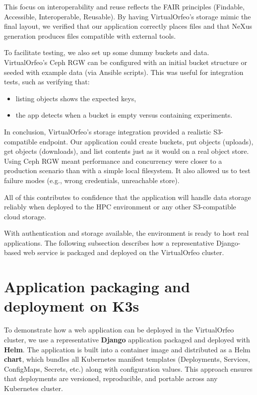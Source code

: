This focus on interoperability and reuse reflects the FAIR principles (Findable, 
Accessible, Interoperable, Reusable). By having VirtualOrfeo’s storage mimic the 
final layout, we verified that our application correctly places files and that 
NeXus generation produces files compatible with external tools.

\medskip

To facilitate testing, we also set up some dummy buckets and data. VirtualOrfeo’s 
Ceph RGW can be configured with an initial bucket structure or seeded with 
example data (via Ansible scripts). This was useful for integration tests, such 
as verifying that:  

\begin{itemize}
	\item listing objects shows the expected keys,  
	\item the app detects when a bucket is empty versus containing experiments.  
\end{itemize}

\medskip

In conclusion, VirtualOrfeo’s storage integration provided a realistic 
S3-compatible endpoint. Our application could create buckets, put objects 
(uploads), get objects (downloads), and list contents just as it would on a real 
object store. Using Ceph RGW meant performance and concurrency were closer to a 
production scenario than with a simple local filesystem. It also allowed us to 
test failure modes (e.g., wrong credentials, unreachable store).  

All of this contributes to confidence that the application will handle data 
storage reliably when deployed to the HPC environment or any other S3-compatible 
cloud storage.

\medskip
\noindent With authentication and storage available, the environment is ready 
to host real applications. 
The following subsection describes how a representative Django-based web service 
is packaged and deployed on the VirtualOrfeo cluster.


\section{Application packaging and deployment on K3s}

To demonstrate how a web application can be deployed in the VirtualOrfeo cluster, 
we use a representative \textbf{Django} application packaged and deployed with 
\textbf{Helm}. The application is built into a container image and distributed 
as a Helm \textbf{chart}, which bundles all Kubernetes manifest templates 
(Deployments, Services, ConfigMaps, Secrets, etc.) along with configuration 
values. This approach ensures that deployments are versioned, reproducible, and 
portable across any Kubernetes cluster.

